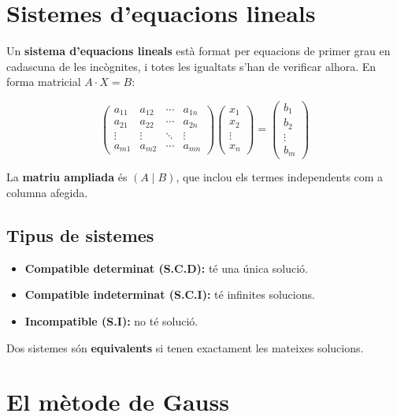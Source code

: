 \section{Sistemes d'equacions lineals}

Un \textbf{sistema d'equacions lineals} està format per equacions de primer grau en cadascuna de les incògnites, i totes les igualtats s'han de verificar alhora. En forma matricial $A\cdot X = B$:

\begin{equation*}
\begin{pmatrix} a_{11} & a_{12} & \cdots & a_{1n} \\ a_{21} & a_{22} & \cdots & a_{2n} \\ \vdots & \vdots & \ddots & \vdots \\ a_{m1} & a_{m2} & \cdots & a_{mn} \end{pmatrix}\begin{pmatrix} x_1 \\ x_2 \\ \vdots \\ x_n \end{pmatrix} = \begin{pmatrix} b_1 \\ b_2 \\ \vdots \\ b_m \end{pmatrix}
\end{equation*}

La \textbf{matriu ampliada} és $(A \mid B)$, que inclou els termes independents com a columna afegida.

\subsection{Tipus de sistemes}

\begin{itemize}
\item \textbf{Compatible determinat (S.C.D):} té una única solució.
\item \textbf{Compatible indeterminat (S.C.I):} té infinites solucions.
\item \textbf{Incompatible (S.I):} no té solució.
\end{itemize}

Dos sistemes són \textbf{equivalents} si tenen exactament les mateixes solucions.

\section{El mètode de Gauss}


